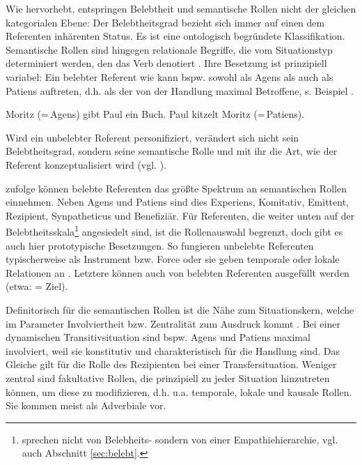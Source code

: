 Wie \textcite[][151--152]{Yamamoto1999} hervorhebt, entspringen Belebtheit und semantische Rollen nicht der gleichen kategorialen Ebene: Der Belebtheitsgrad bezieht sich immer auf einen dem Referenten inhärenten Status. Es ist eine ontologisch begründete Klassifikation. Semantische Rollen sind hingegen relationale Begriffe, die vom Situationstyp determiniert werden, den das Verb denotiert \parencite[13]{Lehmann2004a}. Ihre Besetzung ist prinzipiell variabel: Ein belebter Referent wie  kann bspw. sowohl als Agens als auch als Patiens auftreten, d.h. als der von der Handlung maximal Betroffene, s. Beispiel . 
 
\begin{exe}
	\ex \label{ex:rollen}
	\begin{xlist}
	 	\ex Moritz (=\,Agens) gibt Paul ein Buch.
		\ex Paul kitzelt Moritz (=\,Patiens).
 
	\end{xlist}
\end{exe}
\noindent
 
Wird ein unbelebter Referent personifiziert, verändert sich nicht sein Belebtheitsgrad, sondern seine semantische Rolle und mit ihr die Art, wie  der Referent konzeptualisiert wird (vgl. ). 

\textcite[12]{Lehmann2004a} zufolge können belebte Referenten das größte Spektrum an semantischen Rollen einnehmen. Neben Agens und Patiens sind dies Experiens, Komitativ, Emittent, Rezipient, Synpatheticus und Benefiziär.  Für Referenten, die weiter unten auf der Belebtheitsskala\footnote{\textcite{Lehmann2004a} sprechen nicht von Belebheits- sondern von einer 
Empathiehierarchie, vgl. auch Abschnitt \ref{sec:belebt}.} angesiedelt sind, ist die Rollenauswahl begrenzt, doch gibt es auch hier prototypische Besetzungen. So fungieren unbelebte Referenten typischerweise als Instrument bzw. Force oder sie geben temporale oder lokale Relationen an \parencite[76]{Primus2012}. Letztere können auch von belebten Referenten ausgefüllt werden (etwa:  = Ziel). 

Definitorisch für die semantischen Rollen ist die Nähe zum Situationskern, welche im Parameter Involviertheit bzw. Zentralität zum Ausdruck kommt \parencite[6]{Lehmann2004a}. Bei einer dynamischen Transitivsituation sind bspw. Agens und Patiens maximal involviert, weil sie konstitutiv und charakteristisch für die Handlung sind. Das Gleiche gilt für die Rolle des Rezipienten bei einer Transfersituation. Weniger zentral sind fakultative Rollen, die prinzipiell zu jeder Situation hinzutreten können, um diese zu modifizieren, d.h. u.a. temporale, lokale und kausale Rollen. Sie kommen  meist als Adverbiale vor.

